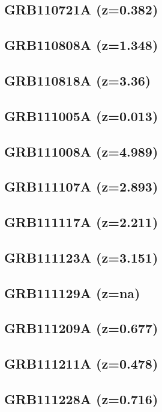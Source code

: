 \documentclass{aa}    %
\begin{document}
\subsection{GRB110721A (z=0.382)}

\subsection{GRB110808A (z=1.348)}

\subsection{GRB110818A (z=3.36)}

\subsection{GRB111005A (z=0.013)}

\subsection{GRB111008A  (z=4.989)}

\subsection{GRB111107A (z=2.893)}

\subsection{GRB111117A (z=2.211)}

\subsection{GRB111123A  (z=3.151)}

\subsection{GRB111129A (z=na)}

\subsection{GRB111209A (z=0.677)}

\subsection{GRB111211A (z=0.478)}

\subsection{GRB111228A (z=0.716)}
\end{document}
